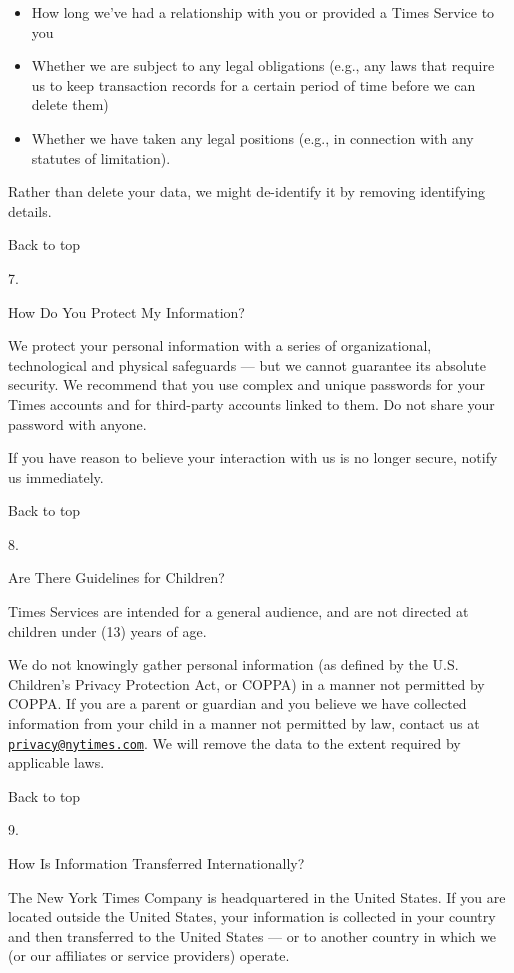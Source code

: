 \begin{itemize}
\tightlist
\item
  How long we've had a relationship with you or provided a Times Service
  to you
\item
  Whether we are subject to any legal obligations (e.g., any laws that
  require us to keep transaction records for a certain period of time
  before we can delete them)
\item
  Whether we have taken any legal positions (e.g., in connection with
  any statutes of limitation).
\end{itemize}

Rather than delete your data, we might de-identify it by removing
identifying details.

Back to top

7.

How Do You Protect My Information?

We protect your personal information with a series of organizational,
technological and physical safeguards --- but we cannot guarantee its
absolute security. We recommend that you use complex and unique
passwords for your Times accounts and for third-party accounts linked to
them. Do not share your password with anyone.

If you have reason to believe your interaction with us is no longer
secure, notify us immediately.

Back to top

8.

Are There Guidelines for Children?

Times Services are intended for a general audience, and are not directed
at children under (13) years of age.

We do not knowingly gather personal information (as defined by the U.S.
Children's Privacy Protection Act, or COPPA) in a manner not permitted
by COPPA. If you are a parent or guardian and you believe we have
collected information from your child in a manner not permitted by law,
contact us at
\href{mailto:privacy@nytimes.com}{\nolinkurl{privacy@nytimes.com}}. We
will remove the data to the extent required by applicable laws.

Back to top

9.

How Is Information Transferred Internationally?

The New York Times Company is headquartered in the United States. If you
are located outside the United States, your information is collected in
your country and then transferred to the United States --- or to another
country in which we (or our affiliates or service providers) operate.

